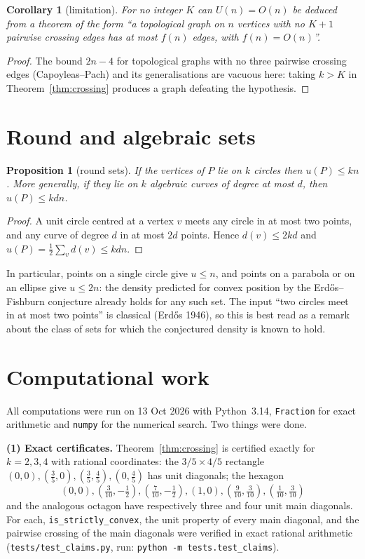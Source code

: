\documentclass[11pt]{article}
\newtheorem{corollary}{Corollary}
\newtheorem{proposition}{Proposition}
\theoremstyle{definition}
\theoremstyle{remark}
\begin{document}
\begin{corollary}[limitation]\label{cor:quasi}
For no integer $K$ can $U(n)=O(n)$ be deduced from a theorem of the form
``a topological graph on $n$ vertices with no $K+1$ pairwise crossing edges has at most
$f(n)$ edges, with $f(n)=O(n)$''.
\end{corollary}
\begin{proof}
The bound $2n-4$ for topological graphs with no three pairwise crossing edges
(Capoyleas--Pach) and its generalisations are vacuous here: taking $k>K$ in
Theorem~\ref{thm:crossing} produces a graph defeating the hypothesis.
\end{proof}

\section{Round and algebraic sets}

\begin{proposition}[round sets]\label{prop:round}
If the vertices of $P$ lie on $k$ circles then $u(P)\le kn$.  More generally, if they
lie on $k$ algebraic curves of degree at most $d$, then $u(P)\le kdn$.
\end{proposition}
\begin{proof}
A unit circle centred at a vertex $v$ meets any circle in at most two points, and any
curve of degree $d$ in at most $2d$ points.  Hence $d(v)\le 2kd$ and
$u(P)=\tfrac12\sum_v d(v)\le kdn$.
\end{proof}

In particular, points on a single circle give $u\le n$, and points on a parabola or on
an ellipse give $u\le2n$: the density predicted for convex position by the
Erd\H{o}s--Fishburn conjecture already holds for any such set.  The input
``two circles meet in at most two points'' is classical (Erd\H{o}s 1946), so this is
best read as a remark about the class of sets for which the conjectured density is
known to hold.

\section{Computational work}

All computations were run on 13 Oct 2026 with Python~3.14, \texttt{Fraction} for exact
arithmetic and \texttt{numpy} for the numerical search.  Two things were done.

\textbf{(1) Exact certificates.}  Theorem~\ref{thm:crossing} is certified exactly for
$k=2,3,4$ with rational coordinates: the $3/5\times4/5$ rectangle
$(0,0),(\tfrac35,0),(\tfrac35,\tfrac45),(0,\tfrac45)$ has unit diagonals; the hexagon
\[
(0,0),(\tfrac3{10},-\tfrac12),(\tfrac7{10},-\tfrac12),(1,0),
(\tfrac9{10},\tfrac3{10}),(\tfrac1{10},\tfrac3{10})
\]
and the analogous octagon have respectively three and four unit main diagonals.  For
each, \texttt{is\_strictly\_convex}, the unit property of every main diagonal, and the
pairwise crossing of the main diagonals were verified in exact rational arithmetic
(\texttt{tests/test\_claims.py}, run: \texttt{python -m tests.test\_claims}).
\end{document}
